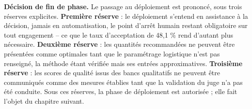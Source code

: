 \textbf{Décision de fin de phase.} Le passage au déploiement est prononcé, sous trois réserves explicites. \textbf{Première réserve} : le déploiement s'entend en assistance à la décision, jamais en automatisation, le point d'arrêt humain restant obligatoire sur tout engagement -- ce que le taux d'acceptation de 48,1 \% rend d'autant plus nécessaire. \textbf{Deuxième réserve} : les quantités recommandées ne peuvent être présentées comme optimales tant que le paramétrage logistique n'est pas renseigné, la méthode étant vérifiée mais ses entrées approximatives. \textbf{Troisième réserve} : les scores de qualité issus des bancs qualitatifs ne peuvent être communiqués comme des mesures établies tant que la validation du juge n'a pas été conduite. Sous ces réserves, la phase de déploiement est autorisée ; elle fait l'objet du chapitre suivant.
